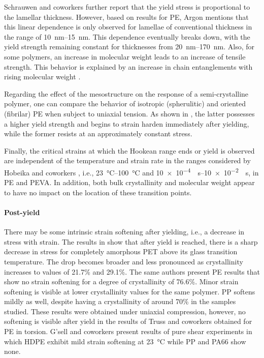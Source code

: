 Schrauwen and coworkers \citep{schrauwenIntrinsicDeformationBehavior2004} further report that the yield stress is proportional to the lamellar thickness.
However, based on results for PE, Argon \citep{argonPhysicsDeformationFracture2013a} mentions that this linear dependence is only observed for lamellae of conventional thickness in the range of \SIrange{10}{15}{\nano\meter}.
This dependence eventually breaks down, with the yield strength remaining constant for thicknesses from \SIrange{20}{170}{\nano\meter}.
Also, for some polymers, an increase in molecular weight leads to an increase of tensile strength.
This behavior is explained by an increase in chain entanglements with rising molecular weight \citep{callister2014materials}.

Regarding the effect of the mesostructure on the response of a semi-crystalline polymer, one can compare the behavior of isotropic (spherulitic) and oriented (fibrilar) PE when subject to uniaxial tension.
As shown in \cite{naViscousForceDominatedTensileDeformation2006}, the latter possesses a higher yield strength and begins to strain harden immediately after yielding, while the former resists at an approximately constant stress.

Finally, the critical strains at which the Hookean range ends or yield is observed are independent of the temperature and strain rate in the ranges considered by Hobeika and coworkers \citep{hobeikaTemperatureStrainRate2000}, i.e., \SIrange{23}{100}{\celsius} and \SIrange{10e-4}{10e-2}{\per\second}, in PE and PEVA.
In addition, both bulk crystallinity and molecular weight appear to have no impact on the location of these transition points.

\paragraph{Post-yield}
There may be some intrinsic strain softening after yielding, i.e., a decrease in stress with strain.
The results in \cite{schrauwenIntrinsicDeformationBehavior2004} show that after yield is reached, there is a sharp decrease in stress for completely amorphous PET above its glass transition temperature.
The drop becomes broader and less pronounced as crystallinity increases to values of 21.7\% and 29.1\%.
The same authors present PE results that show no strain softening for a degree of crystallinity of 76.6\%.
Minor strain softening is visible at lower crystallinity values for the same polymer.
PP softens mildly as well, despite having a crystallinity of around 70\% in the samples studied.
These results were obtained under uniaxial compression, however, no softening is visible after yield in the results of Truss and coworkers \citep{trussEffectHydrostaticPressure1981} obtained for PE in torsion.
G'sell and coworkers \citep{gsellApplicationPlaneSimple1983} present results of pure shear experiments in which HDPE exhibit mild strain softening at \SI{23}{\celsius} while PP and PA66 show none.


